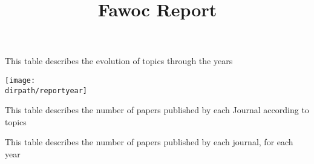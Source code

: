 \documentclass{article}
\newcommand*{\dirpath}{.}%
\begin{document}
	\title{Fawoc Report}
	\maketitle
	\begin{table}[h]
		\centering
		
		\caption{This table describes the evolution of topics through the years}
	\end{table}
	
	
	\texttt{[image: \\dirpath/reportyear]}
	

	\begin{table} 
		\centering
		
		\caption{This table describes the number of papers published by each Journal according to topics}
	\end{table}


	\begin{table}
		\centering
		
		\caption{This table describes the number of papers published by each journal, for each year}
	\end{table}
\end{document}
